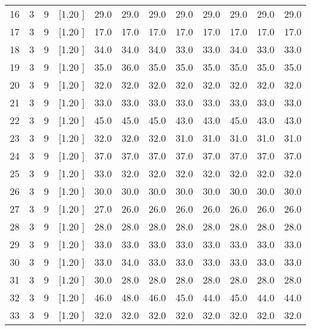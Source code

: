 \documentclass[12pt,a4paper]{article}
\begin{document}
\begin{center}
{\begin{tabular}{r r r r r r r r r r r r}
  16&  3&  9&[1.20      ]&    29.0&    29.0&    29.0&    29.0&    29.0&    29.0&    29.0&    29.0\\[-0.02in]
  17&  3&  9&[1.20      ]&    17.0&    17.0&    17.0&    17.0&    17.0&    17.0&    17.0&    17.0\\[-0.02in]
  18&  3&  9&[1.20      ]&    34.0&    34.0&    34.0&    33.0&    33.0&    34.0&    33.0&    33.0\\[-0.02in]
  19&  3&  9&[1.20      ]&    35.0&    36.0&    35.0&    35.0&    35.0&    35.0&    35.0&    35.0\\[-0.02in]
  20&  3&  9&[1.20      ]&    32.0&    32.0&    32.0&    32.0&    32.0&    32.0&    32.0&    32.0\\[-0.02in]
  21&  3&  9&[1.20      ]&    33.0&    33.0&    33.0&    33.0&    33.0&    33.0&    33.0&    33.0\\[-0.02in]
  22&  3&  9&[1.20      ]&    45.0&    45.0&    45.0&    43.0&    43.0&    45.0&    43.0&    43.0\\[-0.02in]
  23&  3&  9&[1.20      ]&    32.0&    32.0&    32.0&    31.0&    31.0&    31.0&    31.0&    31.0\\[-0.02in]
  24&  3&  9&[1.20      ]&    37.0&    37.0&    37.0&    37.0&    37.0&    37.0&    37.0&    37.0\\[-0.02in]
  25&  3&  9&[1.20      ]&    33.0&    32.0&    32.0&    32.0&    32.0&    32.0&    32.0&    32.0\\[-0.02in]
  26&  3&  9&[1.20      ]&    30.0&    30.0&    30.0&    30.0&    30.0&    30.0&    30.0&    30.0\\[-0.02in]
  27&  3&  9&[1.20      ]&    27.0&    26.0&    26.0&    26.0&    26.0&    26.0&    26.0&    26.0\\[-0.02in]
  28&  3&  9&[1.20      ]&    28.0&    28.0&    28.0&    28.0&    28.0&    28.0&    28.0&    28.0\\[-0.02in]
  29&  3&  9&[1.20      ]&    33.0&    33.0&    33.0&    33.0&    33.0&    33.0&    33.0&    33.0\\[-0.02in]
  30&  3&  9&[1.20      ]&    33.0&    34.0&    33.0&    33.0&    33.0&    33.0&    33.0&    33.0\\[-0.02in]
  31&  3&  9&[1.20      ]&    30.0&    28.0&    28.0&    28.0&    28.0&    28.0&    28.0&    28.0\\[-0.02in]
  32&  3&  9&[1.20      ]&    46.0&    48.0&    46.0&    45.0&    44.0&    45.0&    44.0&    44.0\\[-0.02in]
  33&  3&  9&[1.20      ]&    32.0&    32.0&    32.0&    32.0&    32.0&    32.0&    32.0&    32.0\\[-0.02in]

\end{tabular}}
\end{center}
\end{document}
